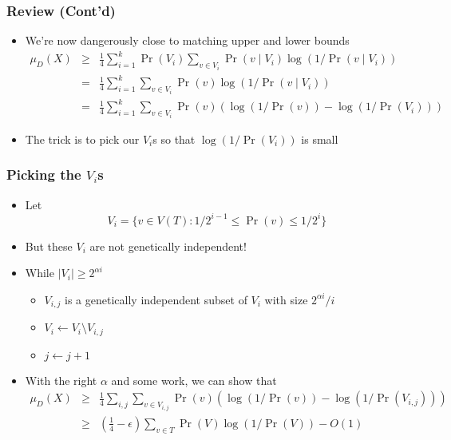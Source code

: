 \documentclass{beamer}
\begin{document}


\frame
{
	\frametitle{Review (Cont'd)}

 	\begin{itemize}
	\item<1-> We're now dangerously close to matching upper and lower bounds
        \begin{eqnarray*}
	\mu_D(X) &\ge &\frac{1}{4}\sum_{i=1}^k
	   \Pr(V_i)\sum_{v\in V_i} \Pr(v\mid V_i)\log(1/\Pr(v\mid V_i)) \\
	& = &\frac{1}{4}\sum_{i=1}^k\sum_{v\in V_i} 
		\Pr(v)\log(1/\Pr(v\mid V_i)) \\
	& = &\frac{1}{4}\sum_{i=1}^k\sum_{v\in V_i} 
		\Pr(v)(\log(1/\Pr(v))-\log(1/\Pr(V_i)))
	\end{eqnarray*}
	\item<2-> The trick is to pick our $V_i$s so that
$\log(1/\Pr(V_i))$ is small
	\end{itemize}

}


\frame
{
	\frametitle{Picking the $V_i$s}

	\begin{itemize}
	\item<1-> Let
	\[
		V_i=\{v\in V(T) :1/2^{i-1} \le \Pr(v) \le 1/2^i \}
	\]
	\item<2-> But these $V_i$ are not genetically independent!
 	\item<3-> While $|V_i|\ge 2^{\alpha i}$
	   \begin{itemize}
		\item $V_{i,j}$ is a genetically independent subset of
			$V_i$ with size $2^{\alpha i}/i$
		\item $V_i\gets V_i\setminus V_{i,j}$
		\item $j\gets j+1$
	   \end{itemize}
	\item<4-> With the right $\alpha$ and some work, we can show that
	\begin{eqnarray*}
	\mu_D(X) & \ge & \frac{1}{4}\sum_{i,j}\sum_{v\in V_{i,j}} 
		\Pr(v)(\log(1/\Pr(v))-\log(1/\Pr(V_{i,j}))) \\
	& \ge & \left(\frac{1}{4}-\epsilon\right)\sum_{v\in T}\Pr(V)\log(1/\Pr(V)) -
O(1)
	\end{eqnarray*}
	\end{itemize}
}
\end{document}
